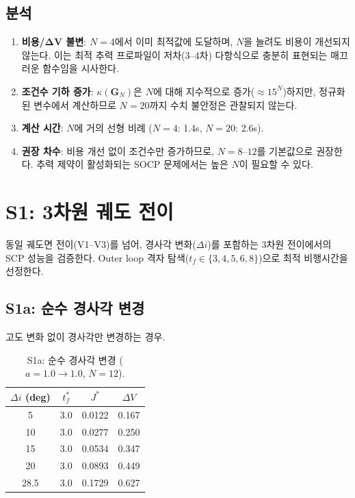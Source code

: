 \documentclass[11pt]{article}
\begin{document}
\subsection{분석}

\begin{enumerate}
  \item \textbf{비용/ΔV 불변}: $N=4$에서 이미 최적값에 도달하며,
        $N$을 늘려도 비용이 개선되지 않는다.
        이는 최적 추력 프로파일이 저차(3--4차) 다항식으로 충분히
        표현되는 매끄러운 함수임을 시사한다.
  \item \textbf{조건수 기하 증가}: $\kappa(\mathbf{G}_N)$은
        $N$에 대해 지수적으로 증가($\approx 15^N$)하지만,
        정규화된 변수에서 계산하므로 $N=20$까지 수치 불안정은 관찰되지 않는다.
  \item \textbf{계산 시간}: $N$에 거의 선형 비례 ($N=4$: 1.4s, $N=20$: 2.6s).
  \item \textbf{권장 차수}: 비용 개선 없이 조건수만 증가하므로,
        $N=8$--$12$를 기본값으로 권장한다.
        추력 제약이 활성화되는 SOCP 문제에서는 높은 $N$이 필요할 수 있다.
\end{enumerate}

\section{S1: 3차원 궤도 전이}
\label{sec:s1}

동일 궤도면 전이(V1--V3)를 넘어, 경사각 변화($\Delta i$)를 포함하는
3차원 전이에서의 SCP 성능을 검증한다.
Outer loop 격자 탐색($t_f \in \{3, 4, 5, 6, 8\}$)으로 최적 비행시간을 선정한다.

\subsection{S1a: 순수 경사각 변경}

고도 변화 없이 경사각만 변경하는 경우.

\begin{table}[h]
\centering
\caption{S1a: 순수 경사각 변경 ($a=1.0 \to 1.0$, $N=12$).}
\label{tab:s1a}
\small
\begin{tabular}{@{}cccc@{}}
\toprule
$\Delta i$ (deg) & $t_f^*$ & $J^*$ & $\Delta V$ \\
\midrule
5   & 3.0 & 0.0122 & 0.167 \\
10  & 3.0 & 0.0277 & 0.250 \\
15  & 3.0 & 0.0534 & 0.347 \\
20  & 3.0 & 0.0893 & 0.449 \\
28.5 & 3.0 & 0.1729 & 0.627 \\
\bottomrule
\end{tabular}
\end{table}
\end{document}
